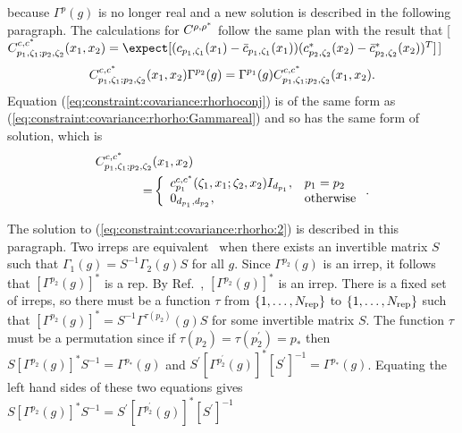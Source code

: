 because $\Gamma^p(g)$
is no longer real and a new solution is described in the following
paragraph.
The calculations for $C^{\rho,\rho^\ast}$ follow the same plan with the
result that
[$\Cccconj(x_1,x_2)=\expect[(c_{p_1,\zeta_1}(x_1)-\bar c_{p_1,\zeta_1}(x_1))
(c_{p_2,\zeta_2}^\ast(x_2)-\bar c_{p_2,\zeta_2}^\ast(x_2))^T]$]
\begin{equation}
C_{p_1,\zeta_1;p_2,\zeta_2}^{c,c^\ast}(x_1,x_2)
\Gamma^{p_2}(g)
=
\Gamma^{p_1}(g)
C_{p_1,\zeta_1;p_2,\zeta_2}^{c,c^\ast}(x_1,x_2)
\label{eq:constraint:covariance:rhorhoconj}
.
\end{equation}
Equation (\ref{eq:constraint:covariance:rhorhoconj}) %
is of the same form as
(\ref{eq:constraint:covariance:rhorho:Gammareal}) %
and so has the same form of solution, which is
\begin{align}
C_{p_1,\zeta_1;p_2,\zeta_2}^{c,c^\ast}&(x_1,x_2)\nonumber\\
=&
\left\{
\begin{array}{ll}
c_{p_1}^{c,c^\ast}(\zeta_1,x_1;\zeta_2,x_2)
I_{d_{p_1}}
,
&
p_1=p_2
\\
0_{d_{p_1},d_{p_2}}
,
&
\mbox{otherwise}
\end{array}
\right.
\label{eq:Cccconj:constraint:xdependent}
.
\end{align}
\par
The solution to (\ref{eq:constraint:covariance:rhorho:2}) %
is described in
this paragraph.
Two irreps are equivalent~\cite[Thm.~I, p.~71]{Cornwell1984}
when there exists an invertible matrix $S$ such
that $\Gamma_1(g)=S^{-1}\Gamma_2(g)S$ for all $g$.
Since $\Gamma^{p_2}(g)$ is an irrep, it follows that
$[\Gamma^{p_2}(g)]^\ast$ is a rep.
By Ref.~\cite[Theorem~3.5 p.~70]{Miller1972}, $[\Gamma^{p_2}(g)]^\ast$ is
an irrep.
There is a fixed set of irreps, so there must be a function $\tau$ from
$\{1,\dots,N_{\rm rep}\}$ to $\{1,\dots,N_{\rm rep}\}$ such that
$[\Gamma^{p_2}(g)]^\ast=S^{-1} \Gamma^{\tau(p_2)}(g) S$ for some invertible
matrix $S$.
The function $\tau$ must be a permutation since if
$\tau(p_2)=\tau(p_2^\prime)=p_\ast$ then
$S [\Gamma^{p_2}(g)]^\ast S^{-1}=\Gamma^{p_\ast}(g)$
and
$S^\prime [\Gamma^{p_2^\prime}(g)]^\ast [S^\prime]^{-1}=\Gamma^{p_\ast}(g)$.
Equating the left hand sides of these two equations gives
$S [\Gamma^{p_2}(g)]^\ast S^{-1}=S^\prime [\Gamma^{p_2^\prime}(g)]^\ast [S^\prime]^{-1}$

